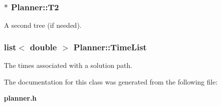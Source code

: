 \subsubsection{ $\ast$ Planner::T2}\label{class_Planner_m8}


A second tree (if needed).

\subsubsection{\setlength{\rightskip}{0pt plus 5cm}list$<$ double $>$ Planner::Time\-List}\label{class_Planner_m10}


The times associated with a solution path.



The documentation for this class was generated from the following file:\begin{CompactItemize}
\item 
{\bf planner.h}\end{CompactItemize}
